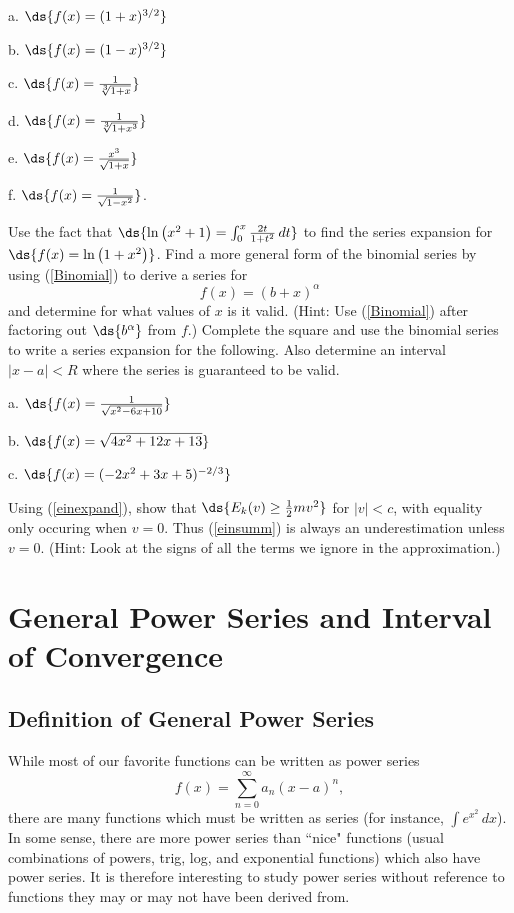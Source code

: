 \begin{description}
\item a. $\ds{f(x)=(1+x)^{3/2}}$
\item b. $\ds{f(x)=(1-x)^{3/2}}$
\item c. $\ds{f(x)=\frac{1}{\sqrt[3]{1+x}}}$
\item d. $\ds{f(x)=\frac{1}{\sqrt[3]{1+x^3}}}$
\item e. $\ds{f(x)=\frac{x^3}{\sqrt{1+x}}}$
\item f. $\ds{f(x)=\frac1{\sqrt{1-x^2}}}$.
\end{description}
\ehw
\bhw Use the fact that $\ds{\ln\left(x^2+1\right)=\int_0^x\frac{2t}
{1+t^2}\,dt}$
to find the series expansion for $\ds{f(x)=\ln\left(1+x^2\right)}$.
\ehw
\bhw Find a more general form of the binomial series
by using (\ref{Binomial}) to derive a series for
\begin{equation}
f(x)=(b+x)^\alpha
\end{equation}
and determine for what values of $x$ is it valid.
(Hint: Use (\ref{Binomial}) after factoring out $\ds{b^\alpha}$ from
$f$.)
\ehw
\bhw Complete the square and use the binomial series to write
a series expansion for the following.  Also determine 
an interval $|x-a|<R$ where the series is guaranteed to be valid. 
\begin{description} 
\item  a. $\ds{f(x)=\frac1{\sqrt{x^2-6x+10}}}$
\item  b. $\ds{f(x)=\sqrt{4x^2+12x+13}}$
\item  c. $\ds{f(x)=(-2x^2+3x+5)^{-2/3}}$
\end{description}
\ehw
\bhw Using (\ref{einexpand}), show that 
$\ds{E_k(v)\ge\frac12mv^2}$ for $|v|<c$, with equality only occuring
when $v=0$.  Thus (\ref{einsumm}) is always an underestimation 
unless $v=0$. (Hint:  Look at the signs of all the terms we ignore in
the approximation.) 
\ehw


\newpage
\section[Power Series, Interval of Convergence]{General Power Series and
Interval of Convergence}
\subsection{Definition of General Power Series}
While most of our favorite functions can be written as 
power series
\begin{equation}f(x)=\sum_{n=0}^\infty a_n(x-a)^n,\label{Power Series}
\end{equation}
there are many functions which must be written as series
(for instance, $\int e^{x^2}\,dx$). 
In some sense, there are more power series than ``nice" functions
(usual combinations of powers, trig, log, and exponential functions)
which also have power series.
It is therefore interesting to study power series without
reference to functions they may or may not have been
derived from.   

